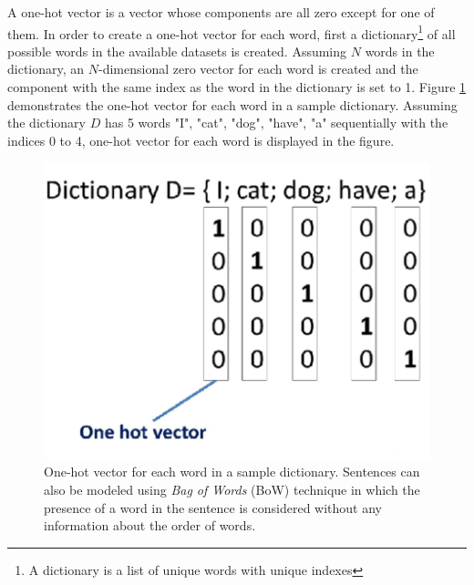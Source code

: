 \documentclass[preprint, 12pt]{elsarticle}
\begin{document}
		A one-hot vector is a vector whose components are all zero except for one of them. In order to create a one-hot vector for each word, first a dictionary\footnote{A dictionary is a list of unique words with unique indexes} of all possible words in the available datasets is created. Assuming $N$ words in the dictionary, an $N$-dimensional zero vector for each word is created and the component with the same index as the word in the dictionary is set to 1. Figure \ref{fig:onehot} demonstrates the one-hot vector for each word in a sample dictionary. Assuming the dictionary $D$ has 5 words "I", "cat", "dog", "have", "a" sequentially with the indices 0 to 4, one-hot vector for each word is displayed in the figure.
		
		\begin{figure}[h]
			\centering
			\includegraphics[scale=0.5]{Imgs/onehot.png}
			\caption{One-hot vector for each word in a sample dictionary. Sentences can also be modeled using \textit{Bag of Words} (BoW) technique in which the presence of a word in the sentence is considered without any information about the order of words.}
			\label{fig:onehot}
		\end{figure}
		
\end{document}

